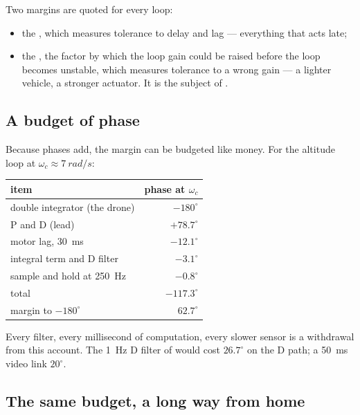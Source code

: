Two margins are quoted for every loop:
\begin{itemize}
  \item the , which measures tolerance to delay and lag — everything that acts late;
  \item the , the factor by which the loop gain could be raised before the loop becomes unstable, which measures tolerance to a wrong gain — a lighter vehicle, a stronger actuator. It is the subject of .
\end{itemize}

\subsection{A budget of phase}
Because phases add, the margin can be budgeted like money. For the altitude loop at $\omega_c \approx \SI{7}{rad/s}$:
\begin{center}\small\sffamily
\begin{tabular}{lr}
\toprule
item & phase at $\omega_c$\\
\midrule
double integrator (the drone) & $-180^\circ$\\
P and D (lead) & $+78.7^\circ$\\
motor lag, \SI{30}{ms} & $-12.1^\circ$\\
integral term and D filter & $-3.1^\circ$\\
sample and hold at \SI{250}{Hz} & $-0.8^\circ$\\
\midrule
total & $-117.3^\circ$\\
margin to $-180^\circ$ & $62.7^\circ$\\
\bottomrule
\end{tabular}
\end{center}
Every filter, every millisecond of computation, every slower sensor is a withdrawal from this account. The \SI{1}{Hz} D filter of  would cost $26.7^\circ$ on the D path; a \SI{50}{ms} video link $20^\circ$.

\subsection{The same budget, a long way from home}

